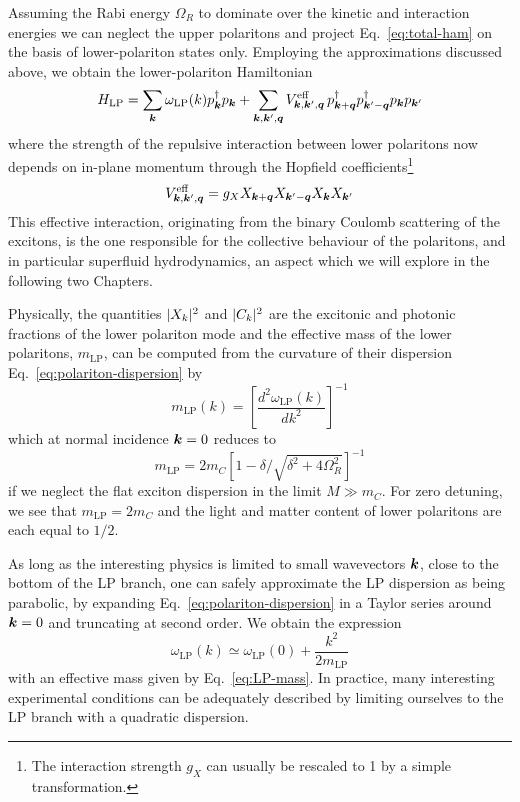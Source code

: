 Assuming the Rabi energy $\Omega_R$ to dominate over the kinetic and
interaction energies we can neglect the upper polaritons and project
Eq.~\eqref{eq:total-ham} on the basis of lower-polariton states
only. Employing the approximations discussed above, we obtain the
lower-polariton Hamiltonian
%
\begin{equation}\label{eq:LP-ham}
  H_{\text{LP}} = \sum_{\bm{k}} \omega_{\text{LP}}(k) p_{\bm{k}}^{\dagger} p_{\bm{k}} + \sum_{\bm{k},\bm{k}^{\prime},\bm{q}} V^{\text{eff}}_{\bm{k},\bm{k}^{\prime},\bm{q}}\, p^{\dagger}_{\bm{k} + \bm{q}} p^{\dagger}_{\bm{k}^{\prime} - \bm{q}} p_{\bm{k}} p_{\bm{k}^{\prime}}
\end{equation}
% 
where the strength of the repulsive interaction between lower
polaritons now depends on in-plane momentum through the Hopfield
coefficients\footnote{The interaction strength $g_X$ can usually be
  rescaled to 1 by a simple transformation.}
%
\begin{equation}\label{eq:g-eff}
  V^{\text{eff}}_{\bm{k},\bm{k}^{\prime},\bm{q}} = g_X X_{\bm{k} + \bm{q}}X_{\bm{k}^{\prime} - \bm{q}}X_{\bm{k}}X_{\bm{k}^{\prime}}
\end{equation}
% 
This effective interaction, originating from the binary Coulomb
scattering of the excitons, is the one responsible for the collective
behaviour of the polaritons, and in particular superfluid
hydrodynamics, an aspect which we will explore in the following two Chapters.

Physically, the quantities $\vert X_k \vert^2$ and $\vert C_k \vert^2$ are the
excitonic and photonic fractions of the lower polariton mode and the
effective mass of the lower polaritons, $m_{\text{LP}}$, can be
computed from the curvature of their dispersion
Eq.~\eqref{eq:polariton-dispersion} by
%
\begin{equation}\label{eq:LP-mass-def}
  m_{\text{LP}}(k) = \left[\frac{d^2 \omega_{\text{LP}}(k)}{dk^2}\right]^{-1}
\end{equation}
% 
which at normal incidence $\bm{k} = 0$ reduces to 
%
\begin{equation}\label{eq:LP-mass}
  m_{\text{LP}} = 2m_C \left[1 - \delta/\sqrt{\delta^2 + 4\Omega_R^2}\right]^{-1}
\end{equation}
% 
if we neglect the flat exciton dispersion in the limit $M \gg
m_C$. For zero detuning, we see that $m_{\text{LP}} = 2m_C$ and the
light and matter content of lower polaritons are each equal to $1/2$.

As long as the interesting physics is limited to small wavevectors
$\bm{k}$, close to the bottom of the LP branch, one can safely
approximate the LP dispersion as being parabolic, by expanding
Eq.~\eqref{eq:polariton-dispersion} in a Taylor series around
$\bm{k} = 0$ and truncating at second order. We obtain the expression
%
\begin{equation}\label{eq:parabolic-disp}
  \omega_{\text{LP}}(k) \simeq \omega_{\text{LP}}(0) + \frac{k^2}{2m_{\text{LP}}}
\end{equation}
% 
with an effective mass given by Eq.~\eqref{eq:LP-mass}. In practice,
many interesting experimental conditions can be adequately described
by limiting ourselves to the LP branch with a quadratic dispersion.


